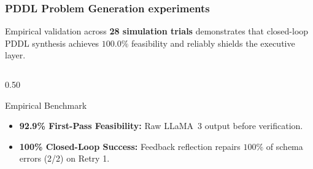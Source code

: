 \documentclass[10pt]{beamer}
\begin{document}
\begin{frame}[t]
    \frametitle{PDDL Problem Generation experiments}
    \footnotesize
    Empirical validation across \textbf{28 simulation trials} demonstrates that closed-loop PDDL synthesis achieves $\mathbf{100.0\%}$ feasibility and reliably shields the executive layer.

    \vspace{0.08cm}
    \begin{columns}[T]
        \begin{column}{0.50\textwidth}
            \begin{block}{Empirical Benchmark}
                \centering
                \vspace{0.05cm}
                \vspace{0.06cm}
                \begin{itemize}\scriptsize
                    \item \textbf{92.9\% First-Pass Feasibility:} Raw LLaMA~3 output before verification.
                    \item \textbf{100\% Closed-Loop Success:} Feedback reflection repairs $100\%$ of schema errors (2/2) on Retry 1.
                \end{itemize}
            \end{block}
        \end{column}


\end{columns}
\end{frame}
\end{document}
